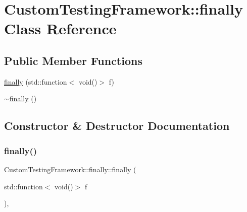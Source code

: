\hypertarget{classCustomTestingFramework_1_1finally}{}\section{Custom\+Testing\+Framework\+::finally Class Reference}
\label{classCustomTestingFramework_1_1finally}
\subsection*{Public Member Functions}
\begin{DoxyCompactItemize}
\item 
\mbox{\hyperlink{classCustomTestingFramework_1_1finally_a1f72c946703189e3cade736c675b3441}{finally}} (std\+::function$<$ void()$>$ f)
\item 
\mbox{\hyperlink{classCustomTestingFramework_1_1finally_a834ad51e1161cecf3483b1ca4a30df6f}{$\sim$finally}} ()
\end{DoxyCompactItemize}


\subsection{Constructor \& Destructor Documentation}
\mbox{\label{classCustomTestingFramework_1_1finally_a1f72c946703189e3cade736c675b3441}} 
\subsubsection{\texorpdfstring{finally()}{finally()}}
{\footnotesize\ttfamily Custom\+Testing\+Framework\+::finally\+::finally (\begin{DoxyParamCaption}\item[{std\+::function$<$ void()$>$}]{f }\end{DoxyParamCaption})\hspace{0.3cm}{\ttfamily [inline]}, {\ttfamily [explicit]}}

\mbox{\label{classCustomTestingFramework_1_1finally_a834ad51e1161cecf3483b1ca4a30df6f}} 
